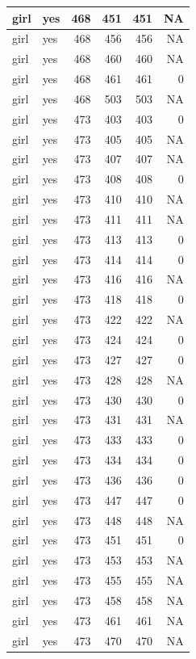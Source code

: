 \documentclass[man]{apa6}
\begin{document}
\begin{tabular}{l|l|r|r|r|r}
\hline
girl & yes & 468 & 451 & 451 & NA\\
\hline
girl & yes & 468 & 456 & 456 & NA\\
\hline
girl & yes & 468 & 460 & 460 & NA\\
\hline
girl & yes & 468 & 461 & 461 & 0\\
\hline
girl & yes & 468 & 503 & 503 & NA\\
\hline
girl & yes & 473 & 403 & 403 & 0\\
\hline
girl & yes & 473 & 405 & 405 & NA\\
\hline
girl & yes & 473 & 407 & 407 & NA\\
\hline
girl & yes & 473 & 408 & 408 & 0\\
\hline
girl & yes & 473 & 410 & 410 & NA\\
\hline
girl & yes & 473 & 411 & 411 & NA\\
\hline
girl & yes & 473 & 413 & 413 & 0\\
\hline
girl & yes & 473 & 414 & 414 & 0\\
\hline
girl & yes & 473 & 416 & 416 & NA\\
\hline
girl & yes & 473 & 418 & 418 & 0\\
\hline
girl & yes & 473 & 422 & 422 & NA\\
\hline
girl & yes & 473 & 424 & 424 & 0\\
\hline
girl & yes & 473 & 427 & 427 & 0\\
\hline
girl & yes & 473 & 428 & 428 & NA\\
\hline
girl & yes & 473 & 430 & 430 & 0\\
\hline
girl & yes & 473 & 431 & 431 & NA\\
\hline
girl & yes & 473 & 433 & 433 & 0\\
\hline
girl & yes & 473 & 434 & 434 & 0\\
\hline
girl & yes & 473 & 436 & 436 & 0\\
\hline
girl & yes & 473 & 447 & 447 & 0\\
\hline
girl & yes & 473 & 448 & 448 & NA\\
\hline
girl & yes & 473 & 451 & 451 & 0\\
\hline
girl & yes & 473 & 453 & 453 & NA\\
\hline
girl & yes & 473 & 455 & 455 & NA\\
\hline
girl & yes & 473 & 458 & 458 & NA\\
\hline
girl & yes & 473 & 461 & 461 & NA\\
\hline
girl & yes & 473 & 470 & 470 & NA\\

\end{tabular}
\end{document}
